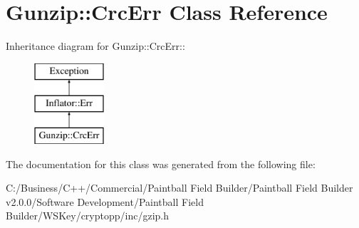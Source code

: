 \hypertarget{class_gunzip_1_1_crc_err}{
\section{Gunzip::CrcErr Class Reference}
\label{class_gunzip_1_1_crc_err}
}
Inheritance diagram for Gunzip::CrcErr::\begin{figure}[H]
\begin{center}
\leavevmode
\includegraphics[height=3cm]{class_gunzip_1_1_crc_err}
\end{center}
\end{figure}


The documentation for this class was generated from the following file:\begin{DoxyCompactItemize}
\item 
C:/Business/C++/Commercial/Paintball Field Builder/Paintball Field Builder v2.0.0/Software Development/Paintball Field Builder/WSKey/cryptopp/inc/gzip.h\end{DoxyCompactItemize}
